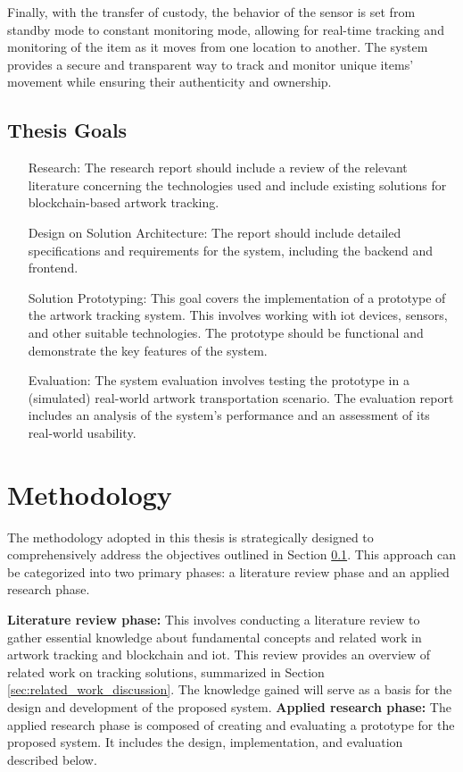 Finally, with the transfer of custody, the behavior of the sensor is set from standby mode to constant monitoring mode, allowing for real-time tracking and monitoring of the item as it moves from one location to another. The system provides a secure and transparent way to track and monitor unique items' movement while ensuring their authenticity and ownership.

\subsection{Thesis Goals}
\label{sec:thesis_goals}
\begin{itemize}[font=\textbf, align=left]
    \item[Research:] The research report should include a review of the relevant literature concerning the technologies used and include existing solutions for blockchain-based artwork tracking.
    \item[Design on Solution Architecture:] The report should include detailed specifications and requirements for the system, including the backend and frontend.
    \item[Solution Prototyping:] This goal covers the implementation of a prototype of the artwork tracking system. This involves working with \gls{iot} devices, sensors, and other suitable technologies. The prototype should be functional and demonstrate the key features of the system.
    \item[Evaluation:] The system evaluation involves testing the prototype in a (simulated) real-world artwork transportation scenario. The evaluation report includes an analysis of the system's performance and an assessment of its real-world usability.
\end{itemize}

\section{Methodology}
The methodology adopted in this thesis is strategically designed to comprehensively address the objectives outlined in Section \ref{sec:thesis_goals}. This approach can be categorized into two primary phases: a literature review phase and an applied research phase.

\textbf{Literature review phase:} This involves conducting a literature review to gather essential knowledge about fundamental concepts and related work in artwork tracking and blockchain and \gls{iot}. This review provides an overview of related work on tracking solutions, summarized in Section \ref{sec:related_work_discussion}. The knowledge gained will serve as a basis for the design and development of the proposed system.
\clearpage
\textbf{Applied research phase:} The applied research phase is composed of creating and evaluating a prototype for the proposed system. It includes the design, implementation, and evaluation described below.

